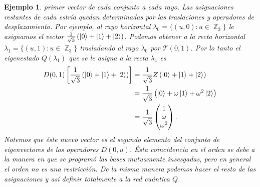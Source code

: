 \documentclass[a4paper]{report}
\DeclareMathOperator{\Z}{\mathbb{Z}}
\newtheorem{example}{Ejemplo}
\begin{document}
\begin{example}
    primer vector de cada conjunto a cada rayo. Las
    asignaciones restantes de cada estría quedan
    determinadas por las traslaciones y operadores de
    desplazamiento. Por ejemplo, al rayo horizontal
    $\lambda_0 = \{(u,0) : u \in \Z_3\}$ le asignamos el
    vector $\frac{1}{\sqrt{3}} \left( \ket 0 + \ket 1 + \ket
    2 \right)$. Podemos obtener a la recta horizontal
    $\lambda_1 = \{(u,1) : u \in \Z_3\}$ trasladando al
    rayo $\lambda_0$ por $\mathcal T(0,1)$. Por lo tanto el
    eigenestado $Q(\lambda_1)$ que se le asigna a la recta
    $\lambda_1$ es
    \begin{align}
      D(0,1) \left[ \frac{1}{\sqrt{3}} \left( \ket 0 + \ket
      1 + \ket 2\right) \right]
      &= \frac{1}{\sqrt{3}} Z \left( \ket 0 + \ket 1 + \ket
      2\right) \\
      &= \frac{1}{\sqrt{3}} \left( \ket 0 + \omega
      \ket 1 + \omega^2 \ket 2\right) \\
      &= \frac{1}{\sqrt{3}} \begin{pmatrix} 1 \\ \omega \\
      \omega^2 \end{pmatrix}.
    \end{align}
    Notemos que éste nuevo vector es el segundo elemento del
    conjunto de eigenvectores de los operadores $D(0,u)$.
    Ésta coincidencia en el orden se debe a la manera en que
    se programó las bases mutuamente insesgadas, pero en
    general el orden no es una restricción. De la misma
    manera podemos hacer el resto de las asignaciones y así
    definir totalmente a la red cuántica $Q$.


\end{example}
\end{document}

